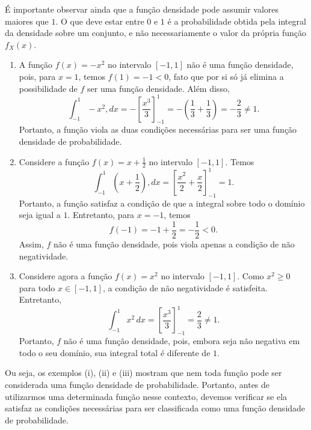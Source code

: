 É importante observar ainda que a função densidade pode assumir valores maiores que \(1\). O que deve estar entre \(0\) e \(1\) é a probabilidade obtida pela integral da densidade sobre um conjunto, e não necessariamente o valor da própria função \(f_X(x)\).

\exemplo
\begin{enumerate}
    \item[(i)] A função $f(x)=-x^2$ no intervalo $[-1,1]$ não é uma função densidade, pois, para $x=1$, temos $f(1)=-1<0$, fato que por si só já elimina a possibilidade de $f$ ser uma função densidade. Além disso,
    \begin{equation}
    \int_{-1}^{1}-x^2,dx=-\left[\frac{x^3}{3}\right]_{-1}^{1}=-\left(\frac{1}{3}+\frac{1}{3}\right)=-\frac{2}{3}\neq 1.
\end{equation}
Portanto, a função viola as duas condições necessárias para ser uma função densidade de probabilidade.

\item[(ii)] Considere a função $f(x)=x+\frac{1}{2}$ no intervalo $[-1,1]$. Temos
\begin{equation}
\int_{-1}^{1}\left(x+\frac{1}{2}\right),dx
=\left[\frac{x^2}{2}+\frac{x}{2}\right]_{-1}^{1}=1.
\end{equation}
Portanto, a função satisfaz a condição de que a integral sobre todo o domínio seja igual a $1$. Entretanto, para $x=-1$, temos
\begin{equation}
f(-1)=-1+\frac{1}{2}=-\frac{1}{2}<0.
\end{equation}
Assim, $f$ não é uma função densidade, pois viola apenas a condição de não negatividade.

\item[(iii)] Considere agora a função $f(x)=x^2$ no intervalo $[-1,1]$. Como $x^2\geq0$ para todo $x\in[-1,1]$, a condição de não negatividade é satisfeita. Entretanto,
\begin{equation}
    \int_{-1}^{1}x^2\,dx
    =\left[\frac{x^3}{3}\right]_{-1}^{1}
    =\frac{2}{3}\neq1.
\end{equation}
Portanto, $f$ não é uma função densidade, pois, embora seja não negativa em todo o seu domínio, sua integral total é diferente de $1$.

\end{enumerate}

Ou seja, os exemplos (i), (ii) e (iii) mostram que nem toda função pode ser considerada uma função densidade de probabilidade. Portanto, antes de utilizarmos uma determinada função nesse contexto, devemos verificar se ela satisfaz as condições necessárias para ser classificada como uma função densidade de probabilidade.

